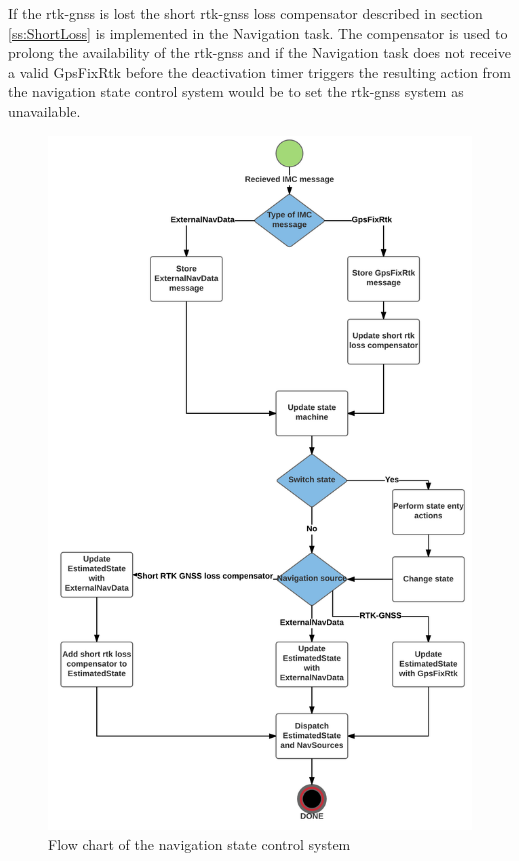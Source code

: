 If the \gls{rtk-gnss} is lost the short \gls{rtk-gnss} loss compensator described in section \ref{ss:ShortLoss} is implemented in the Navigation task. The compensator is used to prolong the availability of the \gls{rtk-gnss} and if the Navigation task does not receive a valid GpsFixRtk before the deactivation timer triggers the resulting action from the navigation state control system would be to set the \gls{rtk-gnss} system as unavailable.
\begin{figure}[H]
\centering
\includegraphics[scale=0.17]{figs/NavStateControl.png}
\caption{Flow chart of the navigation state control system}
\label{Fig:NavStateControlFlow}
\end{figure}
